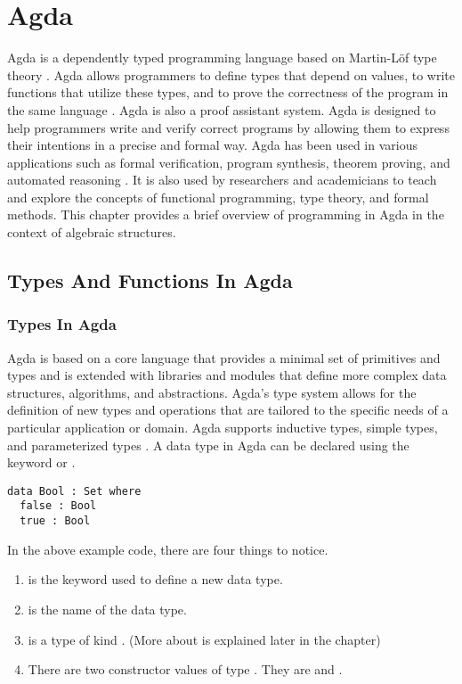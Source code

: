 \chapter{Agda}
Agda is a dependently typed programming language based on Martin-Löf type theory
\cite{AgdaDoc}. Agda allows programmers to define types that depend on values,
to write functions that utilize these types, and to prove the correctness of the
program in the same language \cite{AgdaTB}. Agda is also a proof assistant
system. Agda is designed to help programmers write and verify correct
programs by allowing them to express their intentions in a precise and formal
way. Agda has been used in various applications such as formal verification,
program synthesis, theorem proving, and automated reasoning
\cite{2019arXiv191203028S}. It is also used by researchers and academicians to
teach and explore the concepts of functional programming, type theory, and
formal methods. This chapter provides a brief overview of programming in Agda in
the context of algebraic structures. 

\section{Types And Functions In Agda}
\label{types}
\subsection{Types In Agda}
Agda is based on a core language that provides a minimal set of primitives and
types and is extended with libraries and modules that define more complex data
structures, algorithms, and abstractions. Agda's type system allows for the
definition of new types and operations that are tailored to the specific needs
of a particular application or domain. Agda supports inductive types, simple
types, and parameterized types \cite{10.1007/978-3-642-03359-9_6}. A data type
in Agda can be declared using the keyword  or . 

\begin{verbatim}
data Bool : Set where
  false : Bool 
  true : Bool
\end{verbatim}

In the above example code, there are four things to notice.
\begin{enumerate}
  \item {} is the keyword used to define a new data type. 
  \item {} is the name of the data type.
  \item {} is a type of kind . (More about  is explained later in the chapter)
  \item There are two constructor values of type . They are
   and .
\end{enumerate} 

